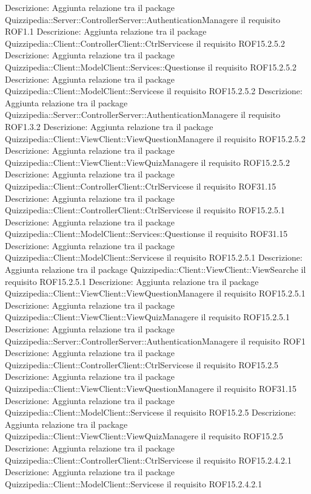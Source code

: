 Descrizione: Aggiunta relazione tra il package Quizzipedia::Server::ControllerServer::AuthenticationManagere il requisito ROF1.1 
Descrizione: Aggiunta relazione tra il package Quizzipedia::Client::ControllerClient::CtrlServicese il requisito ROF15.2.5.2 
Descrizione: Aggiunta relazione tra il package Quizzipedia::Client::ModelClient::Services::Questionse il requisito ROF15.2.5.2 
Descrizione: Aggiunta relazione tra il package Quizzipedia::Client::ModelClient::Servicese il requisito ROF15.2.5.2 
Descrizione: Aggiunta relazione tra il package Quizzipedia::Server::ControllerServer::AuthenticationManagere il requisito ROF1.3.2 
Descrizione: Aggiunta relazione tra il package Quizzipedia::Client::ViewClient::ViewQuestionManagere il requisito ROF15.2.5.2 
Descrizione: Aggiunta relazione tra il package Quizzipedia::Client::ViewClient::ViewQuizManagere il requisito ROF15.2.5.2 
Descrizione: Aggiunta relazione tra il package Quizzipedia::Client::ControllerClient::CtrlServicese il requisito ROF31.15 
Descrizione: Aggiunta relazione tra il package Quizzipedia::Client::ControllerClient::CtrlServicese il requisito ROF15.2.5.1 
Descrizione: Aggiunta relazione tra il package Quizzipedia::Client::ModelClient::Services::Questionse il requisito ROF31.15 
Descrizione: Aggiunta relazione tra il package Quizzipedia::Client::ModelClient::Servicese il requisito ROF15.2.5.1 
Descrizione: Aggiunta relazione tra il package Quizzipedia::Client::ViewClient::ViewSearche il requisito ROF15.2.5.1 
Descrizione: Aggiunta relazione tra il package Quizzipedia::Client::ViewClient::ViewQuestionManagere il requisito ROF15.2.5.1 
Descrizione: Aggiunta relazione tra il package Quizzipedia::Client::ViewClient::ViewQuizManagere il requisito ROF15.2.5.1 
Descrizione: Aggiunta relazione tra il package Quizzipedia::Server::ControllerServer::AuthenticationManagere il requisito ROF1 
Descrizione: Aggiunta relazione tra il package Quizzipedia::Client::ControllerClient::CtrlServicese il requisito ROF15.2.5 
Descrizione: Aggiunta relazione tra il package Quizzipedia::Client::ViewClient::ViewQuestionManagere il requisito ROF31.15 
Descrizione: Aggiunta relazione tra il package Quizzipedia::Client::ModelClient::Servicese il requisito ROF15.2.5 
Descrizione: Aggiunta relazione tra il package Quizzipedia::Client::ViewClient::ViewQuizManagere il requisito ROF15.2.5 
Descrizione: Aggiunta relazione tra il package Quizzipedia::Client::ControllerClient::CtrlServicese il requisito ROF15.2.4.2.1 
Descrizione: Aggiunta relazione tra il package Quizzipedia::Client::ModelClient::Servicese il requisito ROF15.2.4.2.1 
